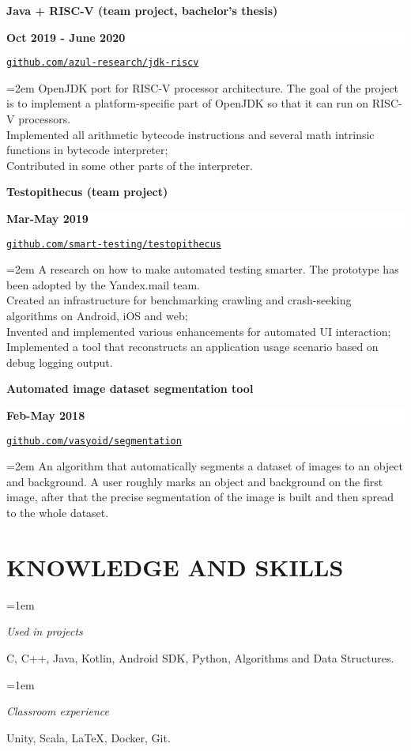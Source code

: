 \documentclass[paper=a4,fontsize=11pt]{scrartcl} %
\newlength{\spacebox}
\newcommand{\sepspace}{\vspace*{0.5em}}		%
\newcommand{\NewPart}[1]{\section*{\uppercase{#1}}}
\newcommand{\PersonalEntry}[2]{
	\noindent\hangindent=2em\hangafter=0 %
	\parbox{\spacebox}{        %
		\textit{#1}}		       %
	\hspace{1.5em} #2 \par}    %
\newcommand{\SkillsEntry}[2]{      %
	\noindent\hangindent=1em\hangafter=0 %
	\parbox{100pt}{	        %
		\textit{#1}}			   %
	\hspace{1.5em} #2 \par}    %
\newcommand{\SomeEntry}[4]{
	\noindent \textbf{#1} \hfill      %
	\colorbox{White}{%
		\parbox{12em}{%
			\hfill\color{Black}\textbf{#2}}} \par  %
	\noindent \texttt{#3} \par        %
	\noindent\hangindent=2em\hangafter=0 \small #4 %
	\normalsize \par}
\begin{document}
	\SomeEntry{Java + RISC-V (team project, bachelor's thesis)}{Oct 2019 - June 2020}{\href{https://github.com/azul-research/jdk-riscv}{github.com/azul-research/jdk-riscv}}{OpenJDK port for RISC-V processor architecture. The goal of the project is to implement a platform-specific part of OpenJDK so that it can run on RISC-V processors.\\
		Implemented all arithmetic bytecode instructions and several math intrinsic functions in bytecode interpreter;\\
		Contributed in some other parts of the interpreter.}
	\sepspace
	\SomeEntry{Testopithecus (team project)}{Mar-May 2019}{\href{https:/github.com/smart-testing/testopithecus}{github.com/smart-testing/testopithecus}}{A research on how to make automated testing smarter. The prototype has been adopted by the Yandex.mail team.\\
		Created an infrastructure for benchmarking crawling and crash-seeking algorithms on Android, iOS and web;\\
		Invented and implemented various enhancements for automated UI interaction;\\
		Implemented a tool that reconstructs an application usage scenario based on debug logging output.} 
	\sepspace
	\SomeEntry{Automated image dataset segmentation tool}{Feb-May 2018}{\href{https://github.com/vasyoid/segmentation}{github.com/vasyoid/segmentation}}{An algorithm that automatically segments a dataset of images to an object and background. A user roughly marks an object and background on the first image, after that the precise segmentation of the image is built and then spread to the whole dataset.} 
	
	\NewPart{Knowledge and Skills}
	
	\SkillsEntry{Used in projects}{C, C++, Java, Kotlin, Android SDK, Python, Algorithms and Data Structures.}
	\SkillsEntry{Classroom experience}{Unity, Scala, \LaTeX, Docker, Git.}
\end{document}
